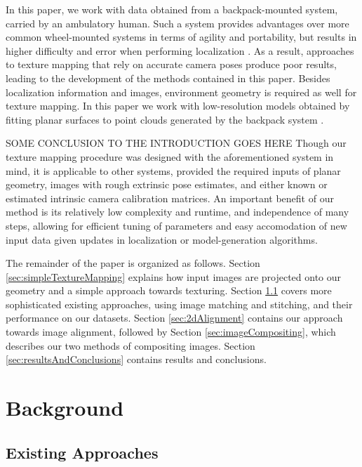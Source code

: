 \documentclass[]{spie}  %
\begin{document}
In this paper, we work with data obtained from a backpack-mounted
system, carried by an ambulatory human. Such a system provides
advantages over more common wheel-mounted systems in terms of agility
and portability, but results in higher difficulty and error when
performing localization \cite{liu2010indoor}. As a result, approaches
to texture mapping that rely on accurate camera poses produce poor
results, leading to the development of the methods contained in this
paper. Besides localization information and images, environment
geometry is required as well for texture mapping. In this paper we
work with low-resolution models obtained by fitting planar surfaces to
point clouds generated by the backpack system \cite{sanchez2012point}.



SOME CONCLUSION TO THE INTRODUCTION GOES HERE Though our texture
mapping procedure was designed with the aforementioned system in mind,
it is applicable to other systems, provided the required inputs of
planar geometry, images with rough extrinsic pose estimates, and
either known or estimated intrinsic camera calibration matrices. An
important benefit of our method is its relatively low complexity and
runtime, and independence of many steps, allowing for efficient tuning
of parameters and easy accomodation of new input data given updates in
localization or model-generation algorithms.

The remainder of the paper is organized as follows. Section
\ref{sec:simpleTextureMapping} explains how input images are projected
onto our geometry and a simple approach towards texturing. Section
\ref{sec:existingApproaches} covers more sophisticated existing
approaches, using image matching and stitching, and their performance
on our datasets. Section \ref{sec:2dAlignment} contains our approach
towards image alignment, followed by Section
\ref{sec:imageCompositing}, which describes our two methods of
compositing images. Section \ref{sec:resultsAndConclusions} contains
results and conclusions.

\section{Background}
\label{sec:background}
\subsection{Existing Approaches}
\label{sec:existingApproaches}
\end{document}
